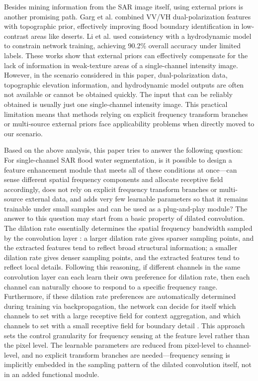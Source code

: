 \documentclass[lettersize,journal]{IEEEtran}
\begin{document}
Besides mining information from the SAR image itself, using external priors is another promising path. Garg et al. \cite{Garg2024RSE} combined VV/VH dual-polarization features with topographic prior, effectively improving flood boundary identification in low-contrast areas like deserts. Li et al. \cite{Li2026JournalofHydrology} used consistency with a hydrodynamic model to constrain network training, achieving 90.2\% overall accuracy under limited labels. These works show that external priors can effectively compensate for the lack of information in weak-texture areas of a single-channel intensity image. However, in the scenario considered in this paper, dual-polarization data, topographic elevation information, and hydrodynamic model outputs are often not available or cannot be obtained quickly. The input that can be reliably obtained is usually just one single-channel intensity image. This practical limitation means that methods relying on explicit frequency transform branches or multi-source external priors face applicability problems when directly moved to our scenario.

Based on the above analysis, this paper tries to answer the following question: For single-channel SAR flood water segmentation, is it possible to design a feature enhancement module that meets all of these conditions at once—can sense different spatial frequency components and allocate receptive field accordingly, does not rely on explicit frequency transform branches or multi-source external data, and adds very few learnable parameters so that it remains trainable under small samples and can be used as a plug-and-play module? The answer to this question may start from a basic property of dilated convolution. The dilation rate essentially determines the spatial frequency bandwidth sampled by the convolution layer \cite{Chen2024CVPR}: a larger dilation rate gives sparser sampling points, and the extracted features tend to reflect broad structural information; a smaller dilation rate gives denser sampling points, and the extracted features tend to reflect local details. Following this reasoning, if different channels in the same convolution layer can each learn their own preference for dilation rate, then each channel can naturally choose to respond to a specific frequency range. Furthermore, if these dilation rate preferences are automatically determined during training via backpropagation, the network can decide for itself which channels to set with a large receptive field for context aggregation, and which channels to set with a small receptive field for boundary detail \cite{Hu2023SAMDConv}. This approach sets the control granularity for frequency sensing at the feature level rather than the pixel level. The learnable parameters are reduced from pixel-level to channel-level, and no explicit transform branches are needed—frequency sensing is implicitly embedded in the sampling pattern of the dilated convolution itself, not in an added functional module.
\end{document}
